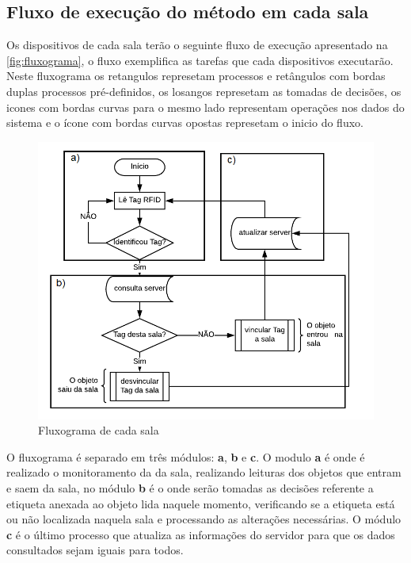 \subsection{Fluxo de execução do método em cada sala}
Os dispositivos de cada sala terão o seguinte fluxo de execução apresentado na \autoref{fig:fluxograma}, o fluxo exemplifica as tarefas que cada dispositivos executarão. Neste fluxograma os retangulos represetam processos e retângulos com bordas duplas processos pré-definidos, os losangos represetam as tomadas de decisões, os icones com bordas curvas para o mesmo lado representam operações nos dados do sistema e o ícone com bordas curvas opostas represetam o inicio do fluxo.
\begin{figure}[H]
              \caption{\label{fig:fluxograma}{Fluxograma de cada sala}}
              \centering
              \includegraphics[width=1\textwidth]{Figuras/fluxograma.png}
\end{figure}
\par
O fluxograma é separado em três módulos: \textbf{a}, \textbf{b} e \textbf{c}. O modulo \textbf{a} é onde é realizado o monitoramento da da sala, realizando leituras dos objetos que entram e saem da sala, no módulo \textbf{b} é o onde serão tomadas as decisões referente a etiqueta anexada ao objeto lida naquele momento, verificando se a etiqueta está ou não localizada naquela sala e processando as alterações necessárias. O módulo \textbf{c} é o último processo que atualiza as informações do servidor para que os dados consultados sejam iguais para todos. 
